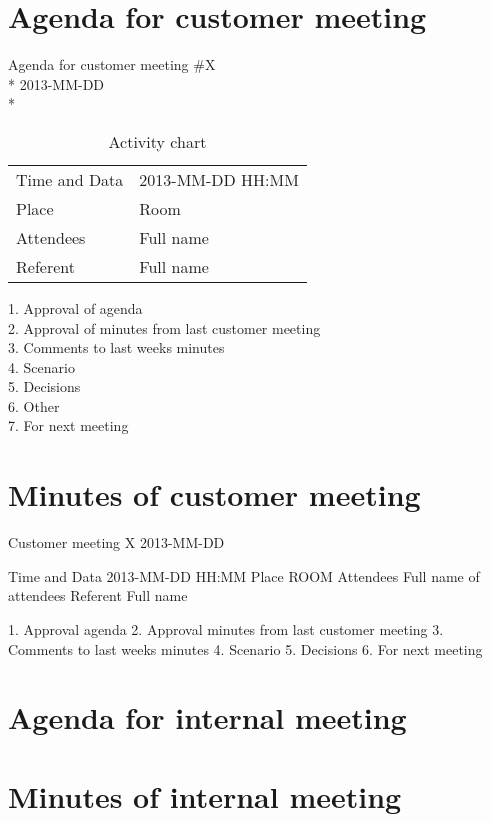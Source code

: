 \section{Agenda for customer meeting}

\begin{center}
Agenda for customer meeting \#X\\*
2013-MM-DD\\*
\end{center}

\begin{table}
\begin{center}
\begin{tabular}{ l | l }
Time and Data & 2013-MM-DD HH:MM \\
Place & Room \\
Attendees & Full name \\
Referent & Full name \\
\end{tabular}
\end{center}
\caption{Activity chart}
\label{table:activityChart}
\end{table}


1. Approval of agenda \\
2. Approval of minutes from last customer meeting \\
3. Comments to last weeks minutes \\
4. Scenario \\
5. Decisions \\
6. Other \\
7. For next meeting \\


\section{Minutes of customer meeting}

Customer meeting X 
2013-MM-DD

Time and Data 	2013-MM-DD HH:MM
Place			ROOM
Attendees  		Full name of attendees
Referent  		Full name

1. Approval agenda
2. Approval minutes from last customer meeting
3. Comments to last weeks minutes
4. Scenario
5. Decisions
6. For next meeting

\section{Agenda for internal meeting}

\section{Minutes of internal meeting}